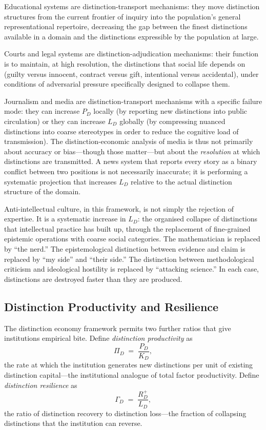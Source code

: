 \documentclass[12pt, letterpaper]{article}
\theoremstyle{remark}
\begin{document}
Educational systems are distinction-transport mechanisms: they move
distinction structures from the current frontier of inquiry into the
population's general representational repertoire, decreasing the gap between
the finest distinctions available in a domain and the distinctions expressible
by the population at large.

Courts and legal systems are distinction-adjudication mechanisms: their
function is to maintain, at high resolution, the distinctions that social life
depends on (guilty versus innocent, contract versus gift, intentional versus
accidental), under conditions of adversarial pressure specifically designed
to collapse them.

Journalism and media are distinction-transport mechanisms with a specific
failure mode: they can increase $P_D$ locally (by reporting new distinctions
into public circulation) or they can increase $L_D$ globally (by compressing
nuanced distinctions into coarse stereotypes in order to reduce the cognitive
load of transmission).  The distinction-economic analysis of media is thus
not primarily about accuracy or bias---though those matter---but about the
\emph{resolution} at which distinctions are transmitted.  A news system that
reports every story as a binary conflict between two positions is not
necessarily inaccurate; it is performing a systematic projection that increases
$L_D$ relative to the actual distinction structure of the domain.

Anti-intellectual culture, in this framework, is not simply the rejection of
expertise.  It is a systematic increase in $L_D$: the organised collapse of
distinctions that intellectual practice has built up, through the replacement
of fine-grained epistemic operations with coarse social categories.  The
mathematician is replaced by ``the nerd.''  The epistemological distinction
between evidence and claim is replaced by ``my side'' and ``their side.''
The distinction between methodological criticism and ideological hostility is
replaced by ``attacking science.''  In each case, distinctions are destroyed
faster than they are produced.

\subsection{Distinction Productivity and Resilience}

The distinction economy framework permits two further ratios that give
institutions empirical bite.  Define \emph{distinction productivity} as
\begin{equation}
  \Pi_D \;=\; \frac{P_D}{K_D},
\end{equation}
the rate at which the institution generates new distinctions per unit of
existing distinction capital---the institutional analogue of total factor
productivity.  Define \emph{distinction resilience} as
\begin{equation}
  \Gamma_D \;=\; \frac{R_D^{+}}{L_D},
\end{equation}
the ratio of distinction recovery to distinction loss---the fraction of
collapsing distinctions that the institution can reverse.
\end{document}
